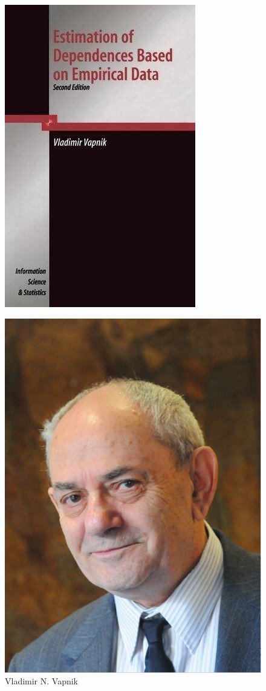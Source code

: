 \documentclass[compress,10pt,dvipsnames,notheorems]{beamer} %
\begin{document}
\begin{frame}
\begin{figure}
\includegraphics[width=.27\linewidth]{Imgs/EDBED.jpg}

\end{figure}
\end{frame}

\begin{frame}
\begin{figure}
\includegraphics[width=.5\linewidth]{Imgs/vapnik.png}
\captionsetup{labelformat=empty}
\caption{Vladimir N. Vapnik}
\end{figure}
\end{frame}
\end{document}
